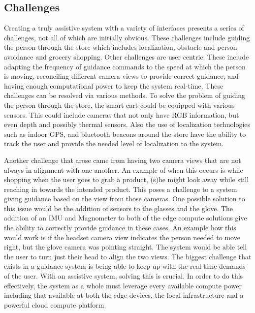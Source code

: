 \subsection{Challenges}
Creating a truly assistive system with a variety of interfaces presents a series 
of challenges, not all of which are initially obvious. These challenges include guiding the person
through the store which includes localization, obstacle and person avoidance and grocery shopping. 
Other challenges are user centric. These include adapting the frequency of guidance commands to the speed at which the person is moving, 
reconciling different camera views to provide correct guidance, and having enough computational power to keep the system real-time. 
These challenges can be resolved via various methods. To solve the problem of guiding the person through the store, the smart cart could be equipped with various sensors. 
This could include cameras that not only have RGB information, but even depth and possibly thermal sensors. 
Also the use of localization technologies such as indoor GPS, and bluetooth beacons around the store have the ability to track the user and 
provide the needed level of localization to the system.

Another challenge that arose came from having two camera views that are not always in alignment with one another. An example of when this occurs is 
while shopping when the user goes to grab a product, (s)he might look away while still reaching in towards the intended product. 
This poses a challenge to a system giving guidance based on the view from those cameras. One possible solution to this issue would be the addition of sensors 
to the glasses and the glove. The addition of an IMU and Magnometer to both of the edge compute solutions give the ability to correctly provide guidance in these cases. 
An example how this would work is if the headset camera view indicates the person needed to move right, 
but the glove camera was pointing straight. The system would be able tell the user to turn just their head to align the two views.
The biggest challenge that exists in a guidance system is being able to keep up with the real-time demands of the user. With an assistive system, 
solving this is crucial. In order to do this effectively, the system as a whole must leverage every available compute power 
including that available at both the edge devices, the local infrastructure and a powerful cloud compute platform. 

